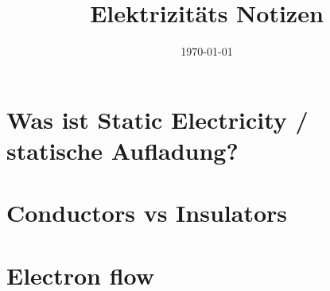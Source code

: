 \documentclass[a4paper, 12pt]{scrartcl}
\title{Elektrizitäts Notizen}
\date{\today}
\begin{document}
    \maketitle
    \tableofcontents
    \section {Was ist Static Electricity / statische Aufladung?}
    
    \section{Conductors vs Insulators}
    
    \section{Electron flow}
    
\end{document}
